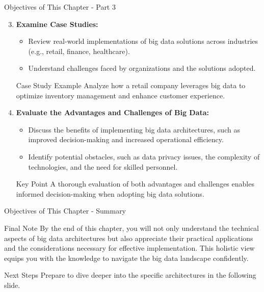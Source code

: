 \documentclass[aspectratio=169]{beamer}
\begin{document}
\begin{frame}[fragile]{Objectives of This Chapter - Part 3}
    \begin{enumerate}
        \setcounter{enumi}{2} %
        \item \textbf{Examine Case Studies:}
            \begin{itemize}
                \item Review real-world implementations of big data solutions across industries (e.g., retail, finance, healthcare).
                \item Understand challenges faced by organizations and the solutions adopted.
            \end{itemize}
            \begin{block}{Case Study Example}
                Analyze how a retail company leverages big data to optimize inventory management and enhance customer experience.
            \end{block}

        \item \textbf{Evaluate the Advantages and Challenges of Big Data:}
            \begin{itemize}
                \item Discuss the benefits of implementing big data architectures, such as improved decision-making and increased operational efficiency.
                \item Identify potential obstacles, such as data privacy issues, the complexity of technologies, and the need for skilled personnel.
            \end{itemize}
            \begin{block}{Key Point}
                A thorough evaluation of both advantages and challenges enables informed decision-making when adopting big data solutions.
            \end{block}
    \end{enumerate}
\end{frame}

\begin{frame}[fragile]{Objectives of This Chapter - Summary}
    \begin{block}{Final Note}
        By the end of this chapter, you will not only understand the technical aspects of big data architectures but also appreciate their practical applications and the considerations necessary for effective implementation. This holistic view equips you with the knowledge to navigate the big data landscape confidently.
    \end{block}
    \begin{block}{Next Steps}
        Prepare to dive deeper into the specific architectures in the following slide.
    \end{block}
\end{frame}
\end{document}
